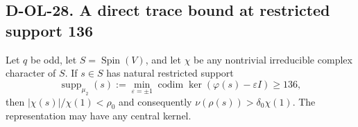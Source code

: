 \subsection*{D-OL-28. A direct trace bound at restricted support 136}

\begin{theorem}[D-OL-28]
Let $q$ be odd, let $S=\operatorname{Spin}(V)$, and let
$\chi$ be any nontrivial irreducible complex character of $S$.
If $s\in S$ has natural restricted support
\[
 \operatorname{supp}_{\mu_2}(s)
      :=\min_{\varepsilon=\pm1}
             \operatorname{codim}\ker(\varphi(s)-\varepsilon I)
      \ge136,
 \tag{SPO.8}
\]
then $|\chi(s)|/\chi(1)<\rho_0$ and consequently
$\nu(\rho(s))>\delta_0\chi(1)$.
The representation may have any central kernel.
\end{theorem}

